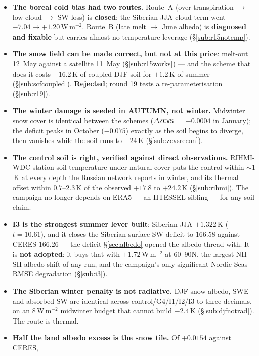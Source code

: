 \documentclass[10pt]{article}
\begin{document}
\begin{itemize}
  \emph{least}-biased parts of the column (\S\ref{sub:soilcol}, \S\ref{sub:tilebias}).
\item \textbf{The boreal cold bias had two routes.} Route~A (over-transpiration $\to$ low
  cloud $\to$ SW loss) is \textbf{closed}: the Siberian JJA cloud term went $-7.04 \to +1.20$\,W\,m$^{-2}$.
  Route~B (late melt $\to$ June albedo) is \textbf{diagnosed and fixable} but carries almost no
  temperature leverage (\S\ref{sub:r15notemp}).
\item \textbf{The snow field can be made correct, but not at this price}: melt-out 12~May
  against a satellite 11~May (\S\ref{sub:r15works}) --- and the scheme that does it costs
  $-16.2$\,K of coupled DJF soil for $+1.2$\,K of summer (\S\ref{sub:scfcoupled}).
  \textbf{Rejected}; round 19 tests a re-parameterisation (\S\ref{sub:r19}).
\item \textbf{The winter damage is seeded in AUTUMN, not winter.} Midwinter snow cover is
  identical between the schemes ($\Delta$\texttt{ZCVS} $=-0.0004$ in January); the deficit
  peaks in October ($-0.075$) exactly as the soil begins to diverge, then vanishes while the
  soil runs to $-24$\,K (\S\ref{sub:zcvsrecon}).
\item \textbf{The control soil is right, verified against direct observations.} RIHMI-WDC
  station soil temperature under natural cover puts the control within ${\sim}1$\,K at every
  depth the Russian network reports in winter, and its thermal offset within $0.7$--$2.3$\,K
  of the observed $+17.8$ to $+24.2$\,K (\S\ref{sub:rihmi}). The campaign no longer depends on
  ERA5 --- an HTESSEL sibling --- for any soil claim.
\item \textbf{I3 is the strongest summer lever built}: Siberian JJA $+1.322$\,K ($t{=}10.61$),
  and it closes the Siberian surface SW deficit to $166.58$ against CERES $166.26$ --- the
  deficit \S\ref{sec:albedo} opened the albedo thread with. It is \textbf{not adopted}: it
  buys that with $+1.72$\,W\,m$^{-2}$ at 60--90N, the largest NH$-$SH albedo shift of any run,
  and the campaign's only significant Nordic Seas RMSE degradation (\S\ref{sub:i3}).
\item \textbf{The Siberian winter penalty is not radiative.} DJF snow albedo, SWE and absorbed
  SW are identical across control/G4/I1/I2/I3 to three decimals, on an $8$\,W\,m$^{-2}$
  midwinter budget that cannot build $-2.4$\,K (\S\ref{sub:djfnotrad}). The route is thermal.
\item \textbf{Half the land albedo excess is the snow tile.} Of $+0.0154$ against CERES,

\end{itemize}
\end{document}
